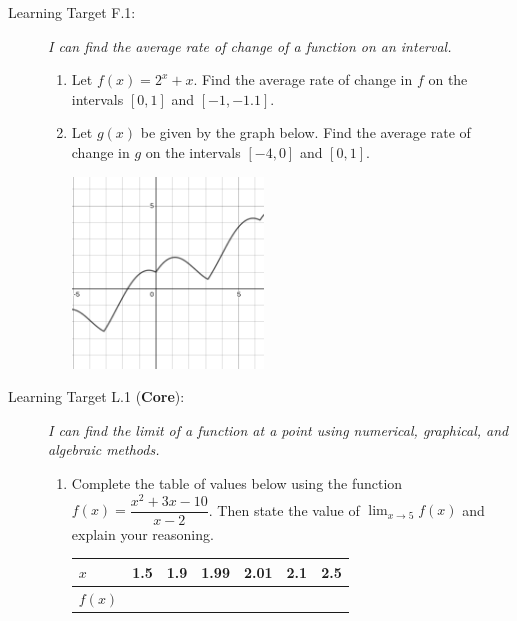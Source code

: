 \documentclass[11 pt]{article}
\begin{document}
\begin{description}

\item[Learning Target F.1: ] \textit{I can find the average rate of change of a function on an interval.}

\begin{enumerate}
    \item Let $f(x) = 2^x + x$. Find the average rate of change in $f$ on the intervals $[0,1]$ and $[-1, -1.1]$. 
    \item Let $g(x)$ be given by the graph below. Find the average rate of change in $g$ on the intervals $[-4,0]$ and $[0,1]$. 
    \begin{center}
        \includegraphics[width=2in]{c2p2-sample-f1.png}
    \end{center}
\end{enumerate}

\vfill \eject

\item[Learning Target L.1 (\textbf{Core}): ] \textit{I can find the limit of a function at a point using numerical, graphical, and algebraic methods.} 

\begin{enumerate}
    \item Complete the table of values below using the function $f(x) = \dfrac{x^2 + 3x -10}{x-2}$. Then state the value of $\lim_{x \to 5} f(x)$ and explain your reasoning. 
    
        \begin{tabular}{l|l|l|l|l|l|l}
        $x$    & 1.5 & 1.9 & 1.99 & 2.01 & 2.1 & 2.5 \\ \hline
        $f(x)$ &     &     &      &      &     &    
        \end{tabular}
        

\end{enumerate}
\end{description}
\end{document}
